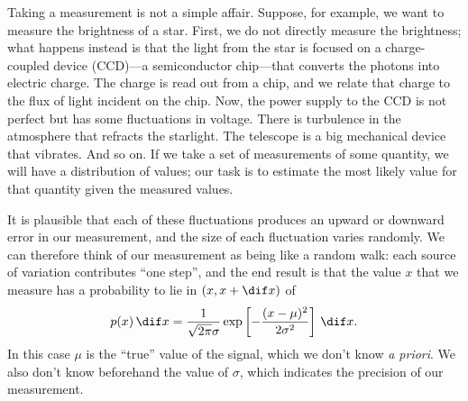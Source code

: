 Taking a measurement is not a simple affair.  Suppose, for example, we want to measure the brightness of a star.  First, we do not directly measure the brightness; what happens instead is that the light from the star is focused on a charge-coupled device (CCD)---a semiconductor chip---that converts the photons into electric charge.  The charge is read out from a chip, and we relate that charge to the flux of light incident on the chip.  Now, the power supply to the CCD is not perfect but has some fluctuations in voltage.  There is turbulence in the atmosphere that refracts the starlight. The telescope is a big mechanical device that vibrates. And so on. If we take a set of measurements of some quantity, we will have a distribution of values; our task is to estimate the most likely value for that quantity given the measured values.

It is plausible that each of these fluctuations produces an upward or downward error in our measurement, and the size of each fluctuation varies randomly.  We can therefore think of our measurement as being like a random walk: each source of variation contributes ``one step'', and the end result is that the value $x$ that we measure has a probability to lie in $(x,x+\dif x)$ of
\[ p(x)\,\dif x = \frac{1}{\sqrt{2\pi}\sigma}\exp\left[-\frac{(x-\mu)^{2}}{2\sigma^{2}}\right]\,\dif x. \]
In this case $\mu$ is the ``true'' value of the signal, which we don't know \emph{a priori}.  We also don't know beforehand the value of $\sigma$, which indicates the precision of our measurement.

